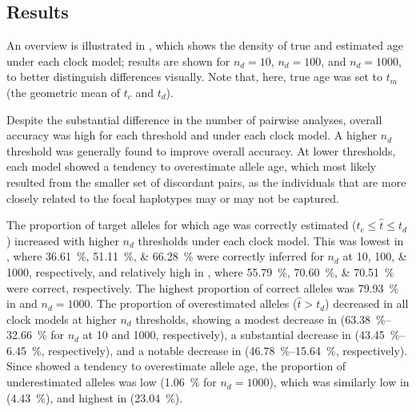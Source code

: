%
\subsection{Results}
%


An overview is illustrated in , which shows the density of true and estimated age under each clock model; results are shown for ${n_d=\num{10}}$, ${n_d=\num{100}}$, and ${n_d=\num{1000}}$, to better distinguish differences visually.
Note that, here, true age was set to $t_m$ (the geometric mean of $t_c$ and $t_d$).


%

%

Despite the substantial difference in the number of pairwise analyses, overall accuracy was high for each threshold and under each clock model.
A higher $n_d$ threshold was generally found to improve overall accuracy.
At lower thresholds, each model showed a tendency to overestimate allele age, which most likely resulted from the smaller set of discordant pairs, as the individuals that are more closely related to the focal haplotypes may or may not be captured.


The proportion of target alleles for which age was correctly estimated (${t_c \leq \hat{t} \leq t_d}$) increased with higher $n_d$ thresholds under each clock model.
This was lowest in \ClockM, where \SIlist{36.61;51.11;66.28}{\percent} were correctly inferred for $n_d$ at \numlist{10;100;1000}, respectively, and relatively high in \ClockR, where \SIlist{55.79;70.60;70.51}{\percent} were correct, respectively.
The highest proportion of correct alleles was \SI{79.93}{\percent} in \ClockC and ${n_d = \num{1000}}$.
The proportion of overestimated alleles (${\hat{t} > t_d}$) decreased in all clock models at higher $n_d$ thresholds, showing a modest decrease in \ClockM (\SIrange{63.38}{32.66}{\percent} for $n_d$ at \num{10} and \num{1000}, respectively), a substantial decrease in \ClockR (\SIrange{43.45}{6.45}{\percent}, respectively), and a notable decrease in \ClockC (\SIrange{46.78}{15.64}{\percent}, respectively).
Since \ClockM showed a tendency to overestimate allele age, the proportion of underestimated alleles was low (\SI{1.06}{\percent} for ${n_d = \num{1000}}$), which was similarly low in \ClockC (\SI{4.43}{\percent}), and highest in \ClockR (\SI{23.04}{\percent}).

